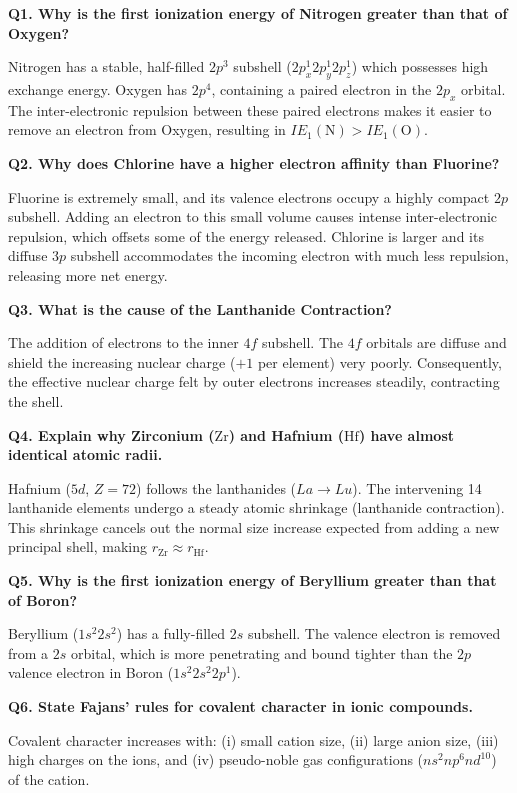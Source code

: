 \documentclass[12pt,a4paper]{article}
\newcommand{\Q}[1]{\textbf{#1}\par\noindent\ignorespaces}
\begin{document}
\begin{tcolorbox}[exambox, title={Frequently Asked / Viva Questions}]
  \Q{Q1. Why is the first ionization energy of Nitrogen greater than that of Oxygen?}
  Nitrogen has a stable, half-filled $2p^3$ subshell ($2p_x^1 2p_y^1 2p_z^1$) which possesses high exchange energy. Oxygen has $2p^4$, containing a paired electron in the $2p_x$ orbital. The inter-electronic repulsion between these paired electrons makes it easier to remove an electron from Oxygen, resulting in $IE_1(\text{N}) > IE_1(\text{O})$.
  \par\vspace{6pt}
  \Q{Q2. Why does Chlorine have a higher electron affinity than Fluorine?}
  Fluorine is extremely small, and its valence electrons occupy a highly compact $2p$ subshell. Adding an electron to this small volume causes intense inter-electronic repulsion, which offsets some of the energy released. Chlorine is larger and its diffuse $3p$ subshell accommodates the incoming electron with much less repulsion, releasing more net energy.
  \par\vspace{6pt}
  \Q{Q3. What is the cause of the Lanthanide Contraction?}
  The addition of electrons to the inner $4f$ subshell. The $4f$ orbitals are diffuse and shield the increasing nuclear charge ($+1$ per element) very poorly. Consequently, the effective nuclear charge felt by outer electrons increases steadily, contracting the shell.
  \par\vspace{6pt}
  \Q{Q4. Explain why Zirconium ($\text{Zr}$) and Hafnium ($\text{Hf}$) have almost identical atomic radii.}
  Hafnium ($5d$, $Z=72$) follows the lanthanides ($La \to Lu$). The intervening 14 lanthanide elements undergo a steady atomic shrinkage (lanthanide contraction). This shrinkage cancels out the normal size increase expected from adding a new principal shell, making $r_{\text{Zr}} \approx r_{\text{Hf}}$.
  \par\vspace{6pt}
  \Q{Q5. Why is the first ionization energy of Beryllium greater than that of Boron?}
  Beryllium ($1s^2 2s^2$) has a fully-filled $2s$ subshell. The valence electron is removed from a $2s$ orbital, which is more penetrating and bound tighter than the $2p$ valence electron in Boron ($1s^2 2s^2 2p^1$).
  \par\vspace{6pt}
  \Q{Q6. State Fajans' rules for covalent character in ionic compounds.}
  Covalent character increases with: (i) small cation size, (ii) large anion size, (iii) high charges on the ions, and (iv) pseudo-noble gas configurations ($ns^2 np^6 nd^{10}$) of the cation.

\end{tcolorbox}
\end{document}
